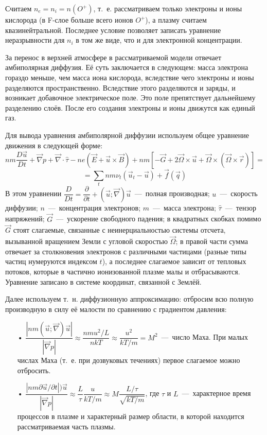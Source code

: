 \documentclass[14pt, a4paper, fleqn]{extarticle}
\begin{document}
Считаем $n_e=n_i = n(O^+)$, т.~е. рассматриваем только электроны и ионы кислорода (в F-слое больше всего ионов $O^+$), а плазму считаем квазинейтральной. Последнее условие позволяет записать уравнение неразрывности для $n_i$ в том же виде, что и для электронной концентрации.

\medskip

За перенос в верхней атмосфере в рассматриваемой модели отвечает амбиполярная диффузия. Её суть заключается в следующем: масса электрона гораздо меньше, чем масса иона кислорода, вследствие чего электроны и ионы разделяются пространственно. Вследствие этого разделяются и заряды, и возникает добавочное электрическое поле. Это поле препятствует дальнейшему разделению слоёв. После его создания электроны и ионы движутся как единый газ.

Для вывода уравнения амбиполярной диффузии используем общее уравнение движения в следующей форме: $$nm\dfrac{D\vec{u}}{Dt}+\vec{\nabla} p + \vec{\nabla}\cdot \hat{\tau} - ne(\vec{E}+\vec{u}\times \vec{B})+nm[-\vec{G}+2\vec{\Omega}\times \vec{u}+\vec{\Omega}\times(\vec{\Omega}\times\vec{r})]=$$
$$=\sum_t nm\nu_t (\vec{u}_t-\vec{u})+ \vec{f}(\vec{q})$$
В этом уравнении $\dfrac{D}{Dt}=\dfrac{\partial}{\partial t}+(\vec{u}; \vec{\nabla})\vec{u}$~---~полная производная; $u$~---~скорость диффузии; $n$~---~концентрация электронов; $m$~---~масса электрона; $\hat{\tau}$~---~тензор напряжений; $\vec{G}$~---~ускорение свободного падения; в квадратных скобках помимо $\vec{G}$ стоят слагаемые, связанные с неинерциальностью системы отсчета, вызыванной вращением Земли с угловой скоростью $\vec{\Omega}$; в правой части сумма отвечает за столкновения электронов с различными частицами (разные типы частиц нумеруются индексом $t$), а последнее слагаемое зависит от тепловых потоков, которые в частично ионизованной плазме малы и отбрасываются. Уравнение записано в системе координат, связанной с Землёй.

\bigskip

Далее используем т.~н. диффузионную аппроксимацию: отбросим всю полную производную в силу её малости по сравнению с градиентом давления:

\begin{itemize}

\item[•] $\dfrac{|nm(\vec{u}; \vec{\nabla})\vec{u}|}{|\vec{\nabla}p|}\approx \dfrac{nmu^2/L}{nkT}\approx \dfrac{u^2}{kT/m}=M^2$~---~число Маха. При малых числах Маха (т.~е. при дозвуковых течениях) первое слагаемое можно отбросить.

\item[•] $\dfrac{|nm\partial\vec{u}/\partial t|)\vec{u}}{|\vec{\nabla}p|}\approx \dfrac{L}{\tau} \dfrac{u}{kT/m}\approx M\dfrac{L/\tau}{\sqrt{kT/m}}$, где $\tau$ и $L$~---~характерное время процессов в плазме и характерный размер области, в которой находится рассматриваемая часть плазмы.

\end{itemize}
\end{document}
